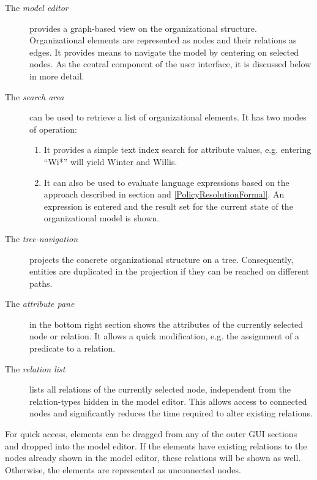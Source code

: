 \begin{description}

  \item[The \emph{model editor}] provides a graph-based view on the organizational structure. Organizational elements are represented as nodes and their relations as edges. It provides means to navigate the model by centering on selected nodes. As the central component of the user interface, it is discussed below in more detail.
	\item[The \emph{search area}] can be used to retrieve a list of organizational elements. It has two modes of operation:
	  \begin{enumerate}
		  \item It provides a simple text index search for attribute values, e.g. entering ``Wi*'' will yield Winter and Willis.
			\item It can also be used to evaluate language expressions based on the approach described in section  and \ref{PolicyResolutionFormal}. An expression is entered and the result set for the current state of the organizational model is shown.
		\end{enumerate}
	\item[The \emph{tree-navigation}] projects the concrete organizational structure on a tree. Consequently, entities are duplicated in the projection if they can be reached on different paths.
	\item[The \emph{attribute pane}] in the bottom right section shows the attributes of the currently selected node or relation. It allows a quick modification, e.g. the assignment of a predicate to a relation.
	\item[The \emph{relation list}] lists all relations of the currently selected node, independent from the relation-types hidden in the model editor. This allows access to connected nodes and significantly reduces the time required to alter existing relations.
\end{description}

For quick access, elements can be dragged from any of the outer GUI sections and dropped into the model editor. If the elements have existing relations to the nodes already shown in the model editor, these relations will be shown as well. Otherwise, the elements are represented as unconnected nodes.

